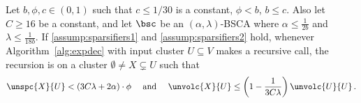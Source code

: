 \begin{lemma}
	\label{lem:recursioncut}
	Let $b, \phi,c \in (0,1)$ such that $c \le 1/30$ is a constant, $\phi < b$, $b \le c$. Also  let $C \ge 16$ be a constant, and let $\bsc$ be an $(\alpha,\lambda)$-BSCA where $\alpha \le \frac{1}{2b}$ and $\lambda \le \frac{1}{18b}$. If \cref{assump:sparsifiers1} and \cref{assump:sparsifiers2} hold, whenever Algorithm~\ref{alg:expdec} with input cluster $U \subseteq V$ makes a recursive call, the recursion is on a cluster $\emptyset \neq X \subsetneq U$ such that
	\begin{equation*}
		\unspc{X}{U} < (3C\lambda+2\alpha)\cdot \phi \quad \text{ and } \quad \unvolc{X}{U} \le \left(1-\frac{1}{3C\lambda}\right)\unvolc{U}{U} \, .
	\end{equation*}
\end{lemma}
